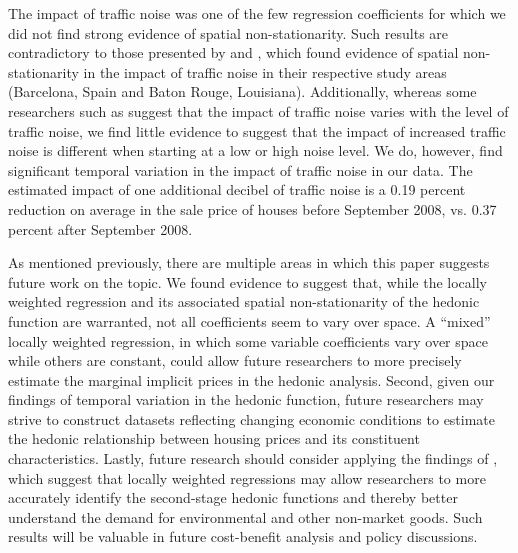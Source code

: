 \documentclass{article}\usepackage{graphicx, color}
\begin{document}
The impact of traffic noise was one of the few regression coefficients for which we did not find strong evidence of spatial non-stationarity. Such results are contradictory to those presented by \citet{MarmolejoDuarteCarlos;GonzalezTamez2009} and \citet{HughesJr.1992}, which found evidence of spatial non-stationarity in the impact of traffic noise in their respective study areas (Barcelona, Spain and Baton Rouge, Louisiana). Additionally, whereas some researchers such as \citet{Theebe2004a} suggest that the impact of traffic noise varies with the level of traffic noise, we find little evidence to suggest that the impact of increased traffic noise is different when starting at a low or high noise level. We do, however, find significant temporal variation in the impact of traffic noise in our data. The estimated impact of one additional decibel of traffic noise is a 0.19 percent reduction on average in the sale price of houses before September 2008, vs. 0.37 percent after September 2008. 

As mentioned previously, there are multiple areas in which this paper suggests future work on the topic. We found evidence to suggest that, while the locally weighted regression and its associated spatial non-stationarity of the hedonic function are warranted, not all coefficients seem to vary over space. A ``mixed'' locally weighted regression, in which some variable coefficients vary over space while others are constant, could allow future researchers to more precisely estimate the marginal implicit prices in the hedonic analysis. Second, given our findings of temporal variation in the hedonic function, future researchers may strive to construct datasets reflecting changing economic conditions to estimate the hedonic relationship between housing prices and its constituent characteristics. Lastly, future research should consider applying the findings of \citet{Carruthers2010}, which suggest that locally weighted regressions may allow researchers to more accurately identify the second-stage hedonic functions and thereby better understand the demand for environmental and other non-market goods. Such results will be valuable in future cost-benefit analysis and policy discussions.



\end{document}
